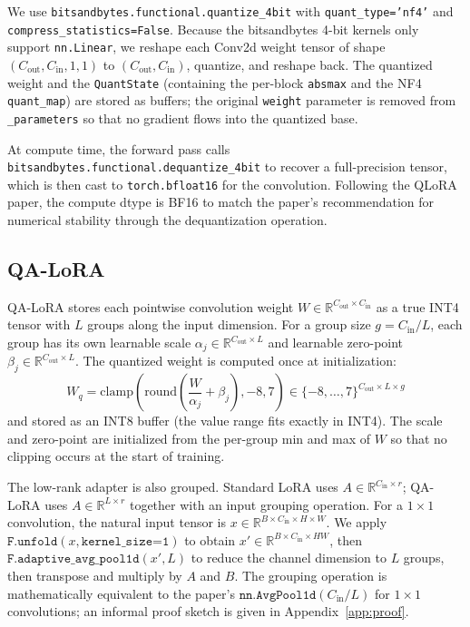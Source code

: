 \documentclass[conference]{IEEEtran}
\begin{document}
We use \texttt{bitsandbytes.functional.quantize\_4bit} with \texttt{quant\_type='nf4'} and \texttt{compress\_statistics=False}. Because the bitsandbytes 4-bit kernels only support \texttt{nn.Linear}, we reshape each Conv2d weight tensor of shape $(C_{\text{out}}, C_{\text{in}}, 1, 1)$ to $(C_{\text{out}}, C_{\text{in}})$, quantize, and reshape back. The quantized weight and the \texttt{QuantState} (containing the per-block \texttt{absmax} and the NF4 \texttt{quant\_map}) are stored as buffers; the original \texttt{weight} parameter is removed from \texttt{\_parameters} so that no gradient flows into the quantized base.

At compute time, the forward pass calls \texttt{bitsandbytes.functional.dequantize\_4bit} to recover a full-precision tensor, which is then cast to \texttt{torch.bfloat16} for the convolution. Following the QLoRA paper, the compute dtype is BF16 to match the paper's recommendation for numerical stability through the dequantization operation.

\subsection{QA-LoRA}
QA-LoRA stores each pointwise convolution weight $W \in \mathbb{R}^{C_{\text{out}}\times C_{\text{in}}}$ as a true INT4 tensor with $L$ groups along the input dimension. For a group size $g = C_{\text{in}} / L$, each group has its own learnable scale $\alpha_j \in \mathbb{R}^{C_{\text{out}}\times L}$ and learnable zero-point $\beta_j \in \mathbb{R}^{C_{\text{out}}\times L}$. The quantized weight is computed once at initialization:
\begin{equation}
W_q = \mathrm{clamp}\left(\mathrm{round}\!\left(\frac{W}{\alpha_j} + \beta_j\right), -8, 7\right) \in \{-8,\dots,7\}^{C_{\text{out}}\times L\times g}
\end{equation}
and stored as an INT8 buffer (the value range fits exactly in INT4). The scale and zero-point are initialized from the per-group min and max of $W$ so that no clipping occurs at the start of training.

The low-rank adapter is also grouped. Standard LoRA uses $A \in \mathbb{R}^{C_{\text{in}}\times r}$; QA-LoRA uses $A \in \mathbb{R}^{L\times r}$ together with an input grouping operation. For a $1\times 1$ convolution, the natural input tensor is $x \in \mathbb{R}^{B\times C_{\text{in}}\times H\times W}$. We apply $\texttt{F.unfold}(x, \texttt{kernel\_size=1})$ to obtain $x' \in \mathbb{R}^{B\times C_{\text{in}}\times H W}$, then $\texttt{F.adaptive\_avg\_pool1d}(x', L)$ to reduce the channel dimension to $L$ groups, then transpose and multiply by $A$ and $B$. The grouping operation is mathematically equivalent to the paper's $\texttt{nn.AvgPool1d}(C_{\text{in}}/L)$ for $1\times 1$ convolutions; an informal proof sketch is given in Appendix~\ref{app:proof}.
\end{document}

